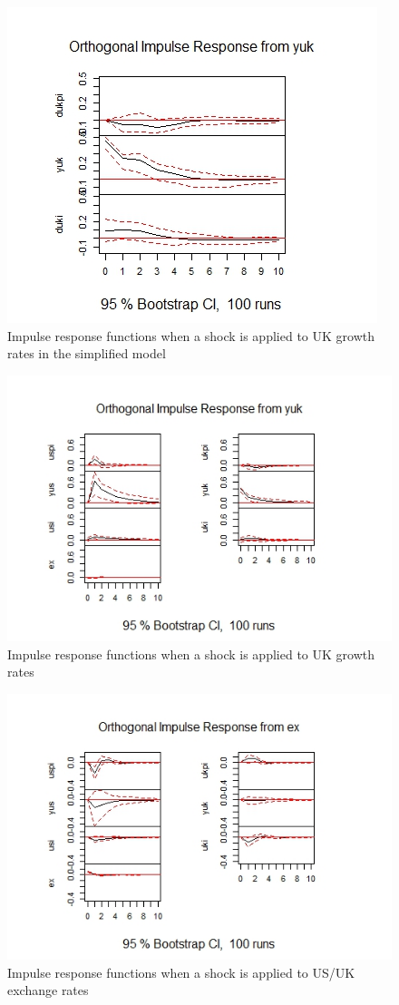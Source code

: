 \documentclass[12pt]{article}
\begin{document}
\begin{figure}[H]
\centering
\includegraphics[scale=.8]{yuk.jpeg} 
\caption{Impulse response functions when a shock is applied to UK growth rates in the simplified model}\label{yuk}
\end{figure}
\begin{figure}[H]
\centering
\includegraphics[scale=.8]{irfuk.jpeg} 
\caption{Impulse response functions when a shock is applied to UK growth rates}\label{irfuk}
\end{figure}
\begin{figure}[H]
\centering
\includegraphics[scale=.85]{irfex.jpeg}  
\caption{Impulse response functions when a shock is applied to US/UK exchange rates}\label{irfex}
\end{figure}


\end{document}
